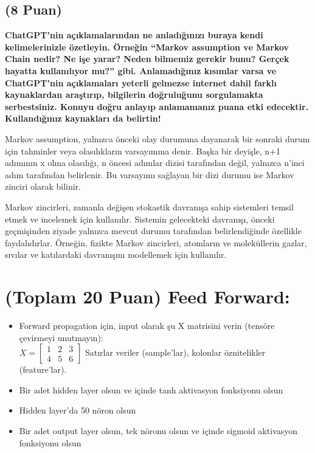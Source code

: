 \documentclass[11pt]{article}
\begin{document}
\subsection{(8 Puan)} \textbf{ChatGPT’nin açıklamalarından ne anladığınızı buraya kendi kelimelerinizle özetleyin. Örneğin ``Markov assumption ve Markov Chain nedir? Ne işe yarar? Neden bilmemiz gerekir bunu? Gerçek hayatta kullanılıyor mu?'' gibi. Anlamadığınız kısımlar varsa ve ChatGPT’nin açıklamaları yeterli gelmezse internet dahil farklı kaynaklardan araştırıp, bilgilerin doğruluğunu sorgulamakta serbestsiniz. Konuyu doğru anlayıp anlamamanız puana etki edecektir. Kullandığınız kaynakları da belirtin!}

Markov assumption, yalnızca önceki olay durumuna dayanarak bir sonraki durum için tahminler veya olasılıkların varsayımına denir. Başka bir deyişle, n+1 adımının x olma olasılığı, n öncesi adımlar dizisi tarafından değil, yalnızca n'inci adım tarafından belirlenir. Bu varsayımı sağlayan bir dizi durumu ise Markov zinciri olarak bilinir. 

Markov zincirleri, zamanla değişen stokastik davranışa sahip sistemleri temsil etmek ve incelemek için kullanılır. Sistemin gelecekteki davranışı, önceki geçmişinden ziyade yalnızca mevcut durumu tarafından belirlendiğinde özellikle faydalıdırlar. Örneğin, fizikte Markov zincirleri, atomların ve moleküllerin gazlar, sıvılar ve katılardaki davranışını modellemek için kullanılır.


\section{(Toplam 20 Puan) Feed Forward:}
 
\begin{itemize}
    \item Forward propagation için, input olarak şu X matrisini verin (tensöre çevirmeyi unutmayın):\\
    $X = \begin{bmatrix}
        1 & 2 & 3\\
        4 & 5 & 6
        \end{bmatrix}$
    Satırlar veriler (sample'lar), kolonlar öznitelikler (feature'lar).
    \item Bir adet hidden layer olsun ve içinde tanh aktivasyon fonksiyonu olsun
    \item Hidden layer'da 50 nöron olsun
    \item Bir adet output layer olsun, tek nöronu olsun ve içinde sigmoid aktivasyon fonksiyonu olsun
\end{itemize}
\end{document}
